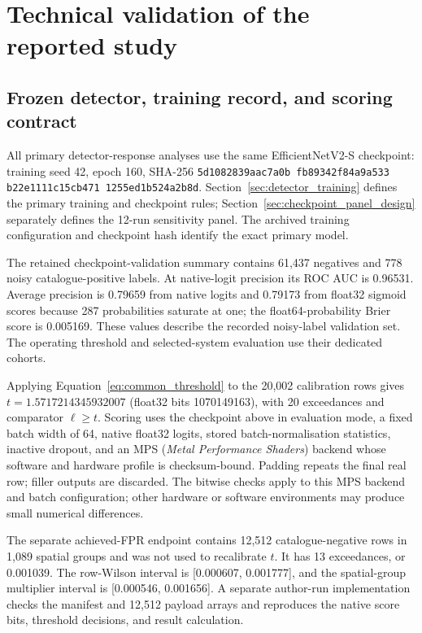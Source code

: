 \section{Technical validation of the reported study}
\label{app:technical_validation}

\subsection{Frozen detector, training record, and scoring contract}

All primary detector-response analyses use the same EfficientNetV2-S checkpoint:
training seed 42, epoch 160, SHA-256
\texttt{5d1082839aac7a0b\allowbreak
fb89342f84a9a533\allowbreak
b22e1111c15cb471\allowbreak
1255ed1b524a2b8d}. Section~\ref{sec:detector_training} defines the primary
training and checkpoint rules; Section~\ref{sec:checkpoint_panel_design}
separately defines the 12-run sensitivity panel. The archived training
configuration and checkpoint hash identify the exact primary model.

The retained checkpoint-validation summary contains 61,437 negatives and 778
noisy catalogue-positive labels. At native-logit precision its ROC AUC is
0.96531. Average precision is 0.79659 from native logits and 0.79173 from
float32 sigmoid scores because 287 probabilities saturate at one; the
float64-probability Brier score is 0.005169. These values describe the
recorded noisy-label validation set. The operating threshold and
selected-system evaluation use their dedicated cohorts.

Applying Equation~\ref{eq:common_threshold} to the 20,002 calibration rows
gives \(t=1.5717214345932007\) (float32 bits 1070149163), with 20
exceedances and comparator \(\ell\geq t\). Scoring uses the checkpoint above
in evaluation mode, a fixed batch width of 64, native float32 logits, stored
batch-normalisation statistics, inactive dropout, and an MPS
(\emph{Metal Performance Shaders}) backend whose software and hardware
profile is checksum-bound. Padding repeats the final real row; filler outputs
are discarded. The bitwise checks apply to this MPS backend and batch
configuration; other hardware or software environments may produce small
numerical differences.

The separate achieved-FPR endpoint contains 12,512 catalogue-negative rows
in 1,089 spatial groups and was not used to recalibrate \(t\). It has 13
exceedances, or 0.001039. The row-Wilson interval is
[0.000607, 0.001777], and the spatial-group multiplier interval is
[0.000546, 0.001656]. A separate author-run implementation checks the
manifest and 12,512 payload arrays and reproduces the native score bits,
threshold decisions, and result calculation.

